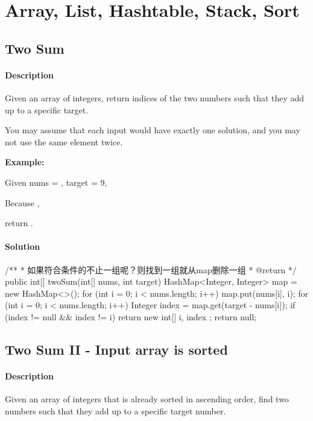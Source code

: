 \chapter{Array, List, Hashtable, Stack, Sort}

\section{Two Sum} %

\subsubsection{Description}
Given an array of integers, return indices of the two numbers such that they add up to a specific target.

You may assume that each input would have exactly one solution, and you may not use the same element twice.

\textbf{Example:}

Given nums = \code{[2, 7, 11, 15]}, target = 9,

Because ,

return \code{[0, 1]}.

\subsubsection{Solution}

\begin{Code}
/**
 * 如果符合条件的不止一组呢？则找到一组就从map删除一组
 * @return
 */
public int[] twoSum(int[] nums, int target) {
    HashMap<Integer, Integer> map = new HashMap<>();
    for (int i = 0; i < nums.length; i++) {
        map.put(nums[i], i);
    }
    for (int i = 0; i < nums.length; i++) {
        Integer index = map.get(target - nums[i]);
        if (index != null && index != i) {
            return new int[] {
                    i, index
            };
        }
    }
    return null;
}
\end{Code}

\newpage

\section{Two Sum II - Input array is sorted} %

\subsubsection{Description}
Given an array of integers that is already sorted in ascending order, find two numbers such that they add up to a specific target number.

